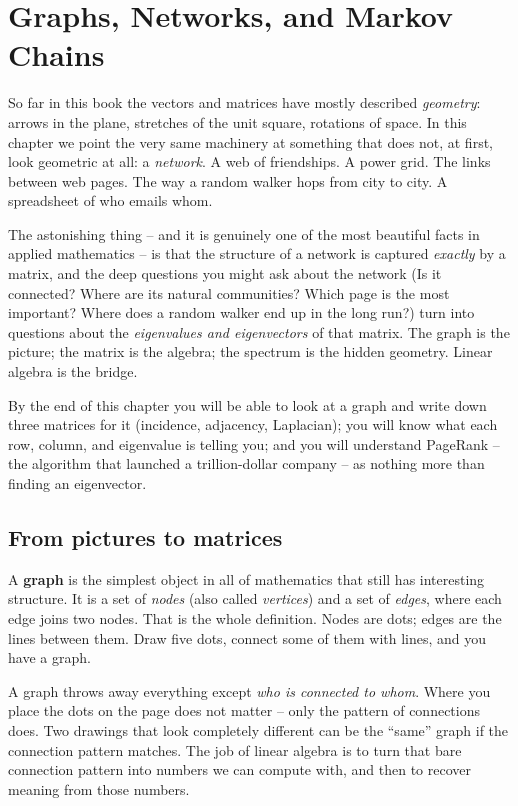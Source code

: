 \chapter{Graphs, Networks, and Markov Chains}

So far in this book the vectors and matrices have mostly described \emph{geometry}:
arrows in the plane, stretches of the unit square, rotations of space. In this chapter
we point the very same machinery at something that does not, at first, look geometric at
all: a \emph{network}. A web of friendships. A power grid. The links between web pages.
The way a random walker hops from city to city. A spreadsheet of who emails whom.

The astonishing thing -- and it is genuinely one of the most beautiful facts in applied
mathematics -- is that the structure of a network is captured \emph{exactly} by a matrix,
and the deep questions you might ask about the network (Is it connected? Where are its
natural communities? Which page is the most important? Where does a random walker end up
in the long run?) turn into questions about the \emph{eigenvalues and eigenvectors} of
that matrix. The graph is the picture; the matrix is the algebra; the spectrum is the
hidden geometry. Linear algebra is the bridge.

By the end of this chapter you will be able to look at a graph and write down three
matrices for it (incidence, adjacency, Laplacian); you will know what each row, column,
and eigenvalue is telling you; and you will understand PageRank -- the algorithm that
launched a trillion-dollar company -- as nothing more than finding an eigenvector.

\section{From pictures to matrices}
\label{ch35:pictures-to-matrices}

A \textbf{graph} is the simplest object in all of mathematics that still has interesting
structure. It is a set of \emph{nodes} (also called \emph{vertices}) and a set of
\emph{edges}, where each edge joins two nodes. That is the whole definition. Nodes are
dots; edges are the lines between them. Draw five dots, connect some of them with lines,
and you have a graph.

\begin{intuitionbox}
A graph throws away everything except \emph{who is connected to whom}. Where you place
the dots on the page does not matter -- only the pattern of connections does. Two drawings
that look completely different can be the ``same'' graph if the connection pattern matches.
The job of linear algebra is to turn that bare connection pattern into numbers we can
compute with, and then to recover meaning from those numbers.
\end{intuitionbox}

